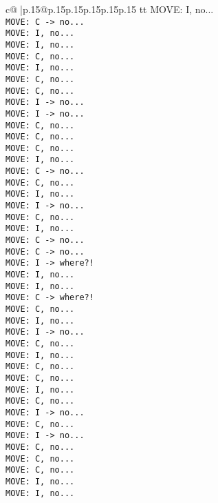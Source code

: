 \documentclass{article}
\begin{document}
{\begin{supertabular}{c@{$\;$}|p{.15\linewidth}@{}p{.15\linewidth}p{.15\linewidth}p{.15\linewidth}p{.15\linewidth}p{.15\linewidth}}
{{{tt  MOVE: I, no...\\ \tt  MOVE: C -> no...\\ \tt  MOVE: I, no...\\ \tt  MOVE: I, no...\\ \tt  MOVE: C, no...\\ \tt  MOVE: I, no...\\ \tt  MOVE: C, no...\\ \tt  MOVE: C, no...\\ \tt  MOVE: I -> no...\\ \tt  MOVE: I -> no...\\ \tt  MOVE: C, no...\\ \tt  MOVE: C, no...\\ \tt  MOVE: C, no...\\ \tt  MOVE: I, no...\\ \tt  MOVE: C -> no...\\ \tt  MOVE: C, no...\\ \tt  MOVE: I, no...\\ \tt  MOVE: I -> no...\\ \tt  MOVE: C, no...\\ \tt  MOVE: I, no...\\ \tt  MOVE: C -> no...\\ \tt  MOVE: C -> no...\\ \tt  MOVE: I -> where?!\\ \tt  MOVE: I, no...\\ \tt  MOVE: I, no...\\ \tt  MOVE: C -> where?!\\ \tt  MOVE: C, no...\\ \tt  MOVE: I, no...\\ \tt  MOVE: I -> no...\\ \tt  MOVE: C, no...\\ \tt  MOVE: I, no...\\ \tt  MOVE: C, no...\\ \tt  MOVE: C, no...\\ \tt  MOVE: I, no...\\ \tt  MOVE: C, no...\\ \tt  MOVE: I -> no...\\ \tt  MOVE: C, no...\\ \tt  MOVE: I -> no...\\ \tt  MOVE: C, no...\\ \tt  MOVE: C, no...\\ \tt  MOVE: C, no...\\ \tt  MOVE: I, no...\\ \tt  MOVE: I, no...\\ \tt  }}}
\end{supertabular}}
\end{document}
